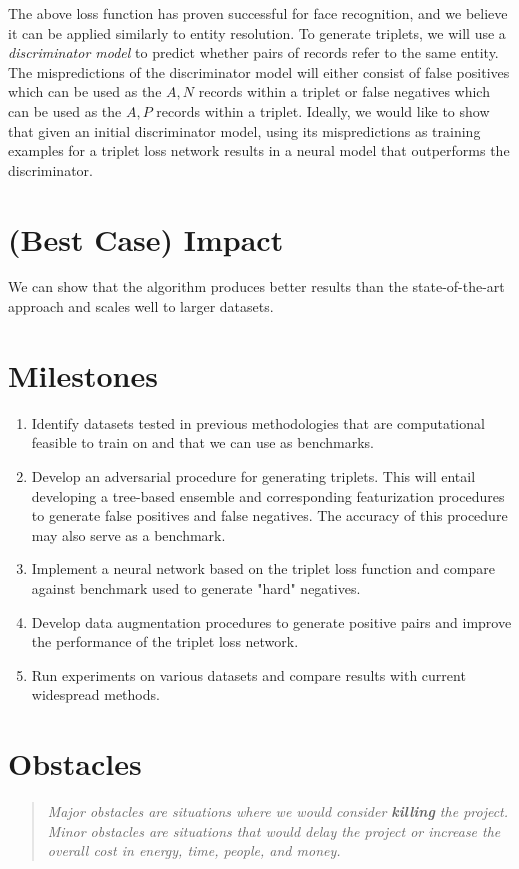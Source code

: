 \documentclass{proc}
\begin{document}
The above loss function has proven successful for face recognition, and we believe it can be applied similarly to entity resolution. To generate triplets,  we will use a \emph{discriminator model} to predict whether pairs of records refer to the same entity. The mispredictions of the discriminator model will either consist of false positives which can be used as the $A, N$ records within a triplet or false negatives which can be used as the $A, P$  records within a triplet. Ideally, we would like to show that given an initial discriminator model, using its mispredictions as training examples for a triplet loss network results in a neural model that outperforms the discriminator.

\section{(Best Case) Impact}

We can show that the algorithm produces better results than the state-of-the-art approach and scales well to larger datasets.

\section{Milestones}

\begin{enumerate}
  \item Identify datasets tested in previous methodologies that are computational feasible to train on and that we can use as benchmarks.
  \item Develop an adversarial procedure for generating triplets. This will entail developing a tree-based ensemble and corresponding featurization procedures to generate false positives and false negatives. The accuracy of this procedure may also serve as a benchmark.
  \item Implement a neural network based on the triplet loss function and compare against benchmark used to generate "hard" negatives.
  \item Develop data augmentation procedures to generate positive pairs and  improve the performance of the triplet loss network.
  \item Run experiments on various datasets and compare results with current widespread methods.
\end{enumerate}

\section{Obstacles}
\begin{quote}
\emph{Major obstacles are situations where we would consider \textbf{killing} the project. 
Minor obstacles are situations that would delay the project or increase the overall cost in energy, time, people, and money.}
\end{quote}
\end{document}
